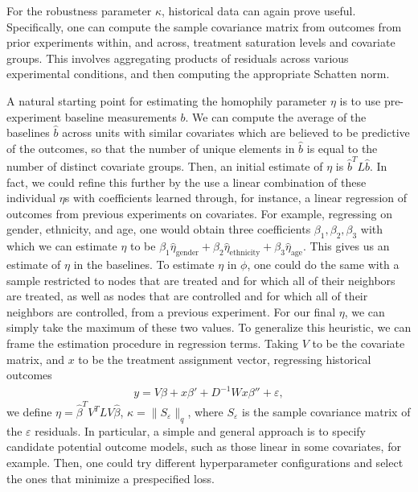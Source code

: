 \documentclass[12pt]{article}
\theoremstyle{definition}
\numberwithin{equation}{section}
\numberwithin{figure}{section}
\numberwithin{equation}{section}
\numberwithin{figure}{section}
\begin{document}
For the robustness parameter $\kappa$, historical data can again prove useful. Specifically, one can compute the sample covariance matrix from outcomes from prior experiments within, and across, treatment saturation levels and covariate groups. This involves aggregating products of residuals across various experimental conditions, and then computing the appropriate Schatten norm.

A natural starting point for estimating the homophily parameter $\eta$ is to use pre-experiment baseline measurements $b$. We can compute the average of the baselines $\hat{b}$ across units with similar covariates which are believed to be predictive of the outcomes, so that the number of unique elements in $\hat{b}$ is equal to the number of distinct covariate groups. Then, an initial estimate of $\eta$ is $\hat{b}^T L \hat{b}$. In fact, we could refine this further by the use a linear combination of these individual $\eta$s with coefficients learned through, for instance, a linear regression of outcomes from previous experiments on covariates. For example, regressing on gender, ethnicity, and age, one would obtain three coefficients $\beta_1, \beta_2, \beta_3$ with which we can estimate $\eta$ to be $\beta_1 \hat{\eta}_{\text{gender}} +\beta_2\hat{\eta}_{\text{ethnicity}} + \beta_3\hat{\eta}_{\text{age}}.$ This gives us an estimate of $\eta$ in the baselines. To estimate $\eta$ in $\phi$, one could do the same with a sample restricted to nodes that are treated and for which all of their neighbors are treated, as well as nodes that are controlled and for which all of their neighbors are controlled,  from a previous experiment. For our final $\eta$, we can simply take the maximum of these two values. To generalize this heuristic, we can frame the estimation procedure in regression terms. Taking $V$ to be the covariate matrix, and $x$ to be the treatment assignment vector, regressing historical outcomes
\begin{align*}
    y = V \beta + x \beta' + D^{-1}W x \beta'' + \varepsilon,
\end{align*}
we define $\eta= \hat{\beta}^T V^T L V \hat{\beta}$, $\kappa = \| S_\varepsilon \|_{q}$, where $S_\varepsilon$ is the sample covariance matrix of the $\varepsilon$ residuals. In particular, a simple and general approach is to specify candidate potential outcome models, such as those linear in some covariates, for example. Then, one could try different hyperparameter configurations and select the ones that minimize a prespecified loss.
\end{document}
